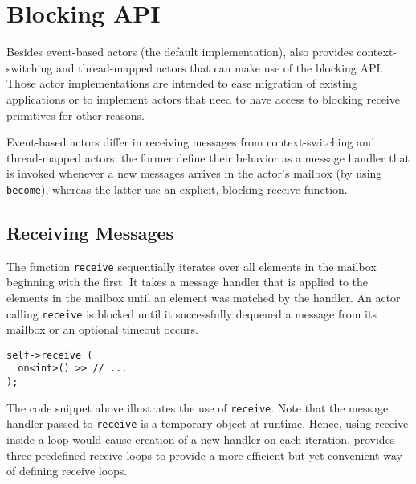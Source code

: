 \section{Blocking API}
\label{Sec::BlockingAPI}

Besides event-based actors (the default implementation), \lib also provides context-switching and thread-mapped actors that can make use of the blocking API.
Those actor implementations are intended to ease migration of existing applications or to implement actors that need to have access to blocking receive primitives for other reasons.

Event-based actors differ in receiving messages from context-switching and thread-mapped actors: the former define their behavior as a message handler that is invoked whenever a new messages arrives in the actor's mailbox (by using \lstinline^become^), whereas the latter use an explicit, blocking receive function.

\subsection{Receiving Messages}

The function \lstinline^receive^ sequentially iterates over all elements in the mailbox beginning with the first.
It takes a message handler that is applied to the elements in the mailbox until an element was matched by the handler.
An actor calling \lstinline^receive^ is blocked until it successfully dequeued a message from its mailbox or an optional timeout occurs.

\begin{lstlisting}
self->receive (
  on<int>() >> // ...
);
\end{lstlisting}

The code snippet above illustrates the use of \lstinline^receive^.
Note that the message handler passed to \lstinline^receive^ is a temporary object at runtime.
Hence, using receive inside a loop would cause creation of a new handler on each iteration.
\lib provides three predefined receive loops to provide a more efficient but yet convenient way of defining receive loops.

